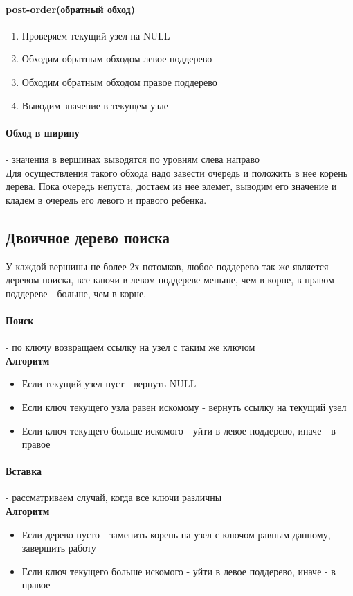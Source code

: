 \documentclass[a4paper,10pt]{article}
\begin{document}
\paragraph{post-order(обратный обход)}
\begin{enumerate}
	\item  Проверяем текущий узел на NULL
	\item  Обходим обратным обходом левое поддерево
	\item  Обходим обратным обходом правое поддерево
	\item  Выводим значение в текущем узле
\end{enumerate}

\paragraph{Обход в ширину} - значения в вершинах выводятся по уровням слева направо\\
Для осуществления такого обхода надо завести очередь и положить в нее корень дерева. Пока очередь непуста, достаем из нее элемет, выводим его значение и кладем в очередь его левого и правого ребенка.
\subsection{Двоичное дерево поиска}
У каждой вершины не более 2х потомков, любое поддерево так же является деревом поиска, все ключи в левом поддереве меньше, чем в корне, в правом поддереве - больше, чем в корне. 
\paragraph{Поиск} - по ключу возвращаем ссылку на узел с таким же ключом\\
\textbf{Алгоритм} \\
\begin{itemize}
	\item Если текущий узел пуст - вернуть NULL
	\item Если ключ текущего узла равен искомому - вернуть ссылку на текущий узел 
	\item Если ключ текущего больше искомого - уйти в левое поддерево, иначе - в правое
\end{itemize}
\paragraph{Вставка} - рассматриваем случай, когда все ключи различны\\
\textbf{Алгоритм}\\
\begin{itemize}
	\item Если дерево пусто - заменить корень на узел с ключом равным данному, завершить работу
	\item Если ключ текущего больше искомого - уйти в левое поддерево, иначе - в правое
\end{itemize}
\end{document}
